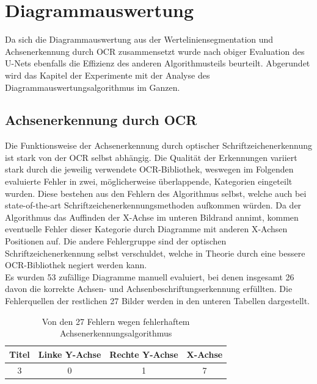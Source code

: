 \section{Diagrammauswertung}

Da sich die Diagrammauswertung aus der Werteliniensegmentation und Achsenerkennung durch OCR zusammensetzt wurde nach obiger Evaluation des U-Nets ebenfalls die Effizienz des anderen Algorithmusteils beurteilt. Abgerundet wird das Kapitel der Experimente mit der Analyse des Diagrammauswertungsalgorithmus im Ganzen.

\subsection{Achsenerkennung durch OCR}
\label{ch:eval_ocr}

Die Funktionsweise der Achsenerkennung durch optischer Schriftzeichenerkennung ist stark von der OCR selbst abhängig. Die Qualität der Erkennungen variiert stark durch die jeweilig verwendete OCR-Bibliothek, weswegen im Folgenden evaluierte Fehler in zwei, möglicherweise überlappende, Kategorien eingeteilt wurden. Diese bestehen aus den Fehlern des Algorithmus selbst, welche auch bei state-of-the-art Schriftzeichenerkennungsmethoden aufkommen würden. Da der Algorithmus das Auffinden der X-Achse im unteren Bildrand annimt, kommen eventuelle Fehler dieser Kategorie durch Diagramme mit anderen X-Achsen Positionen auf. Die andere Fehlergruppe sind der optischen Schriftzeichenerkennung selbst verschuldet, welche in Theorie durch eine bessere OCR-Bibliothek negiert werden kann.
\\
Es wurden 53 zufällige Diagramme manuell evaluiert, bei denen insgesamt 26 davon die korrekte Achsen- und Achsenbeschriftungserkennung erfüllten. Die Fehlerquellen der restlichen 27 Bilder werden in den unteren Tabellen dargestellt.

\begin{table}[h!]
    \centering
    \begin{tabular}{|c|c|c|c|}
        \hline
        \rowcolor[HTML]{EFEFEF}
        Titel & Linke Y-Achse & Rechte Y-Achse & X-Achse \\ \hline
        3     & 0             & 1              & 7       \\ \hline
    \end{tabular}
    \caption{Von den 27 Fehlern wegen fehlerhaftem Achsenerkennungsalgorithmus}
    \label{tb:ocr1}
\end{table}

